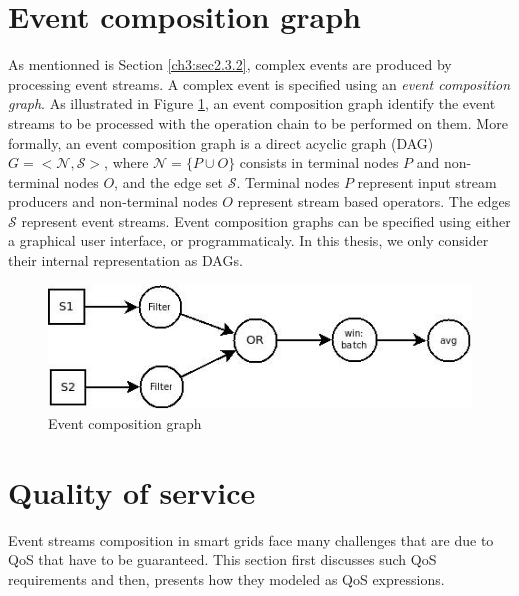  \section{Event composition graph}
 \label{ch3:sec5}
 As mentionned is Section \ref{ch3:sec2.3.2}, complex events are produced by processing event streams. A complex event is specified using an \textit{event composition graph}. As illustrated in Figure \ref{fig:ecg}, an event composition graph identify the event streams to be processed with the operation chain to be performed on them. More formally, an event composition graph is a direct acyclic graph (DAG) $G=<\mathcal{N}, \mathcal{S}>$, where $\mathcal{N}= \{P \cup O\}$ consists in terminal nodes $P$ and non-terminal nodes $O$, and the edge set $\mathcal{S}$. Terminal nodes $P$ represent input stream producers and non-terminal nodes $O$ represent stream based operators. The edges $\mathcal{S}$ represent event streams. Event composition graphs can be specified using either a graphical user interface, or programmaticaly. In this thesis, we only consider their internal representation as DAGs.%
 \begin{figure}[H]
  \begin{center}
    \includegraphics[scale=0.65]{chap3/images/ecg.jpg}
  \end{center}
  \caption{Event composition graph}
  \label{fig:ecg}
\end{figure}
 
 \section{Quality of service}
 \label{ch3:sec-three}
 Event streams composition in smart grids face many challenges that are due to QoS that have to be guaranteed. This section first discusses such QoS requirements and then, presents how they modeled as QoS expressions.              
